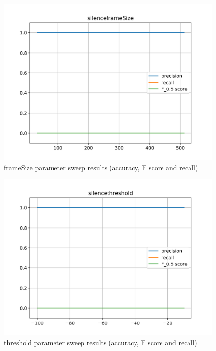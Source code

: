 \begin{figure}[H]
	\includegraphics[clip,width=0.7\columnwidth]{Figures/silenceframeSize.png}%
	\caption{frameSize parameter sweep results (accuracy, F score and recall)}
	\label{fig:silenceframeSize}
\end{figure}

\begin{figure}[H]
	\includegraphics[clip,width=0.7\columnwidth]{Figures/silencethreshold.png}%
	\caption{threshold parameter sweep results (accuracy, F score and recall)}
	\label{fig:silencethreshold}
\end{figure}

\newpage


